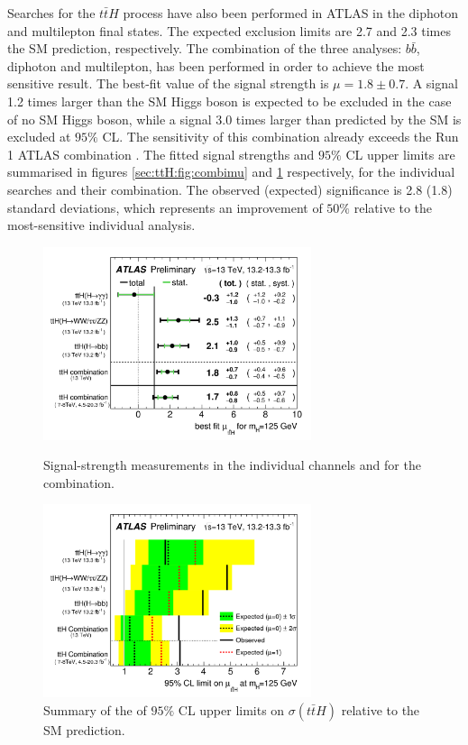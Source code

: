 Searches for the $t\bar{t}H$ process have also been performed in ATLAS in the diphoton \cite{ATLAS-CONF-2016-067} and multilepton \cite{ATLAS-CONF-2016-058} final states. The expected exclusion limits are 2.7 and 2.3 times the SM prediction, respectively. The combination \cite{ATLAS-CONF-2016-068} of the three analyses: $b\bar{b}$, diphoton and multilepton, has been performed in order to achieve the most sensitive result.
The best-fit value of the signal strength is $\mu=1.8\pm0.7$. A signal 1.2 times larger than the SM Higgs boson is expected to be excluded in the case of no SM Higgs boson, while a signal 3.0 times  larger than predicted by the SM is excluded at $95\%$ CL. The sensitivity of this combination already exceeds the Run 1 ATLAS combination \cite{Aad:2016zqi}. The fitted signal strengths and $95\%$ CL upper limits are summarised in figures \ref{sec:ttH:fig:combimu} and \ref{sec:ttH:fig:combilimit} respectively, for the individual searches and their combination. The observed (expected) significance is 2.8 (1.8) standard deviations, which represents an improvement of $50\%$ relative to the most-sensitive individual analysis.

\begin{figure}[p!]
  \centering
  \includegraphics[width=0.7\textwidth]{figures/ttH/fig_01.png}
 \captionsetup{width=0.85\textwidth}  \caption{\small Signal-strength measurements in the individual channels and for the combination.}
  \label{sec:ttH:fig:combimu}

  \centering
  \includegraphics[width=0.7\textwidth]{figures/ttH/fig_03.png}
  \captionsetup{width=0.85\textwidth}  \caption{\small Summary of the of $95\%$ CL upper limits on $\sigma(t\bar{t}H)$ relative to the SM prediction.}
  \label{sec:ttH:fig:combilimit}
\end{figure}




